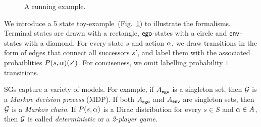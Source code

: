 \begin{figure}
\centering
{}	
\caption{A running example. }
\label{fig:toysg}
\end{figure}
\begin{example}
  We introduce a 5 state toy-example~(Fig.~\ref{fig:toysg}) to
  illustrate the formalisms. Terminal states are drawn with a rectangle,
  $\mathsf{ego}$-states with a circle and $\mathsf{env}$-states with a diamond. For
  every state $s$ and action $\alpha$, we draw transitions in the form
  of edges that connect all successors $s'$, and label them with the
  associated probaiblities $P(s,\alpha)(s')$. For conciseness, we omit
  labelling probability $1$ transitions.
\end{example}
	

SGs capture a variety of models.  For example, if $A_{\mathsf{ego}}$ is a
singleton set, then $\mathcal{G}$ is a \emph{Markov decision process} (MDP).
If both $A_{\mathsf{ego}}$ and $A_{\mathsf{env}}$ are singleton sets, then $\mathcal{G}$ is a
\emph{Markov chain}. If $P(s,\alpha)$ is a Dirac distribution for every
$s \in S$ and $\alpha \in A$, then $\mathcal{G}$ is called
\emph{deterministic} or a \emph{2-player game}.

